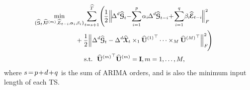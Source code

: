 \documentclass[letterpaper]{article} %
\numberwithin{theorem}{section}
\newcommand{\ten}[1]{ \boldsymbol{\mathcal #1}}
\begin{document}
\begin{equation}\label{HTARIMA_XG1}
\small
\begin{aligned}
&\hspace{-0.4cm} \mathop{\min}_{ \{\widehat{\ten{G}}_t,\hspace{-0.03cm} \widehat{\mathbf U}{^{(m)}}, \hspace{-0.01cm}  \widehat{\ten{E}}_{t-i}, \hspace{-0.03cm} \alpha_i, \hspace{-0.03cm} \beta_i  \}}   \hspace{-0.05cm}\sum_{t=s+1}^{\widehat{T}}\hspace{-0.05cm}  \Bigg (\hspace{-0.05cm} \frac{1}{2} \Big \|  \hspace{-0.05cm}  {\Delta^d   \widehat{\ten{G}}_t} \hspace{-0.07cm}  - \hspace{-0.07cm} \sum_{i=1}^{p} \hspace{-0.03cm} \alpha_i \hspace{-0.03cm} {\Delta^d  \hspace{-0.01cm}  \widehat{\ten{G}}_{t-i}}   \hspace{-0.06cm}  + \hspace{-0.05cm}  \sum_{i=1}^{q}  \hspace{-0.05cm}  \beta_i  \hspace{-0.03cm}  {\widehat{\ten{E}}_{t-i}} \hspace{-0.03cm}  \Big {\|} _F^2  \\ & \ \ \ \ \ \ \ \ \ \ \ \ \ \ \ \  + \frac{1}{2}  \Big \| {\Delta^d   \widehat{\ten{G}}_t}    - {\Delta^d  \widehat{\ten{X}}_t}  \times_1  \widehat{\mathbf U}{^{(1)}}^\top   \cdots \times_M  \widehat{\mathbf U}{^{(M)}}^\top \Big  \| _F^2 \hspace{-0.05cm}  \Bigg)  \ \ \\ &  \ \ \ \ \ \ \ \ \ \ \   \ \ \ \ \ \ \ \  \  \text{s.t.}  \ \ \widehat{ \mathbf U}{^{(m)}}^\top \widehat{ \mathbf U}{^{(m)}} = \mathbf I, m=1,\ldots, M,
\end{aligned}
\end{equation}
where $s\hspace{-0.05cm} = \hspace{-0.05cm}p\hspace{-0.05cm}+\hspace{-0.05cm}d\hspace{-0.05cm}+\hspace{-0.05cm}q$ is the sum of  ARIMA orders, and  is also the minimum input length of each  TS.
\end{document}
